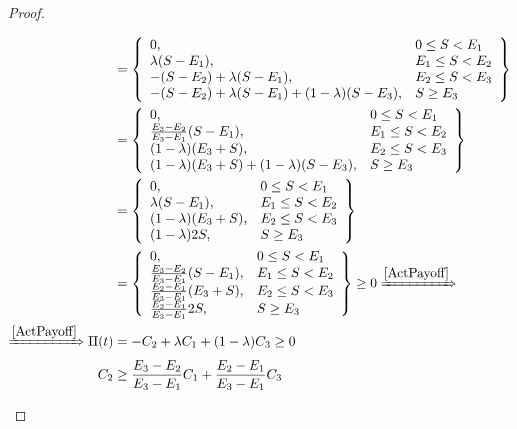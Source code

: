 \begin{proof}
\begin{enumerate}
\begin{align*}
            &=\left\{
            \begin{array}{ll}
              0,       & 0 \leq S < E_1 \\
              \lambda(S-E_1),        & E_1 \leq S < E_2 \\
              - (S-E_2) +\lambda(S-E_1),        & E_2 \leq S < E_3 \\
              - (S-E_2) +\lambda(S-E_1) + (1-\lambda)(S-E_3),        & S \geq E_3
            \end{array}
            \right\} \\
            &=\left\{
            \begin{array}{ll}
              0,       & 0 \leq S < E_1 \\
              \frac{E_3-E_2}{E_3-E_1}(S-E_1),        & E_1 \leq S < E_2 \\
              (1-\lambda)(E_3+S),        & E_2 \leq S < E_3 \\
              (1-\lambda)(E_3+S) + (1-\lambda)(S-E_3),        & S \geq E_3
            \end{array}
            \right\} \\
            &=\left\{
            \begin{array}{ll}
              0,       & 0 \leq S < E_1 \\
              \lambda(S-E_1),        & E_1 \leq S < E_2 \\
              (1-\lambda)(E_3+S),        & E_2 \leq S < E_3 \\
              (1-\lambda)2S,        & S \geq E_3
            \end{array}
            \right\} \\
            &=\left\{
            \begin{array}{ll}
              0,       & 0 \leq S < E_1 \\
              \frac{E_3-E_2}{E_3-E_1}(S-E_1),        & E_1 \leq S < E_2 \\
              \frac{E_2-E_1}{E_3-E_1}(E_3+S),        & E_2 \leq S < E_3 \\
              \frac{E_2-E_1}{E_3-E_1}2S,        & S \geq E_3
            \end{array}
            \right\} \geq 0 \xRightarrow{\ref{ActPayoff}} \\
            \xRightarrow{\ref{ActPayoff}} \Pi(t) &= - C_2 + \lambda C_1 + (1-\lambda) C_3 \geq 0 \\
            C_2 &\geq \frac{E_3-E_2}{E_3-E_1} C_1 + \frac{E_2-E_1}{E_3-E_1} C_3
        \end{align*}
    \end{enumerate}
\end{proof}







